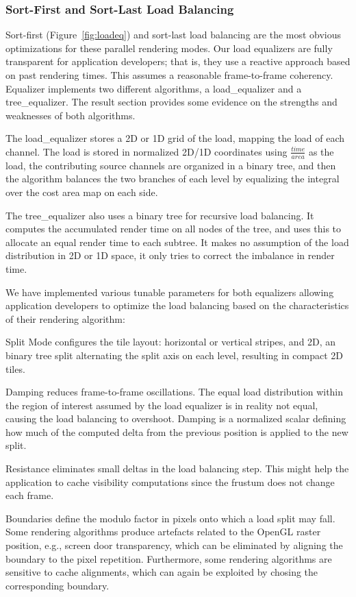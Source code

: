 \documentclass[10pt,journal,compsoc]{IEEEtran}
\newcommand{\fig}[1]{Figure~\ref{#1}}
\begin{document}
\subsubsection{Sort-First and Sort-Last Load Balancing}

Sort-first (\fig{fig:loadeq}) and sort-last load balancing are the most obvious
optimizations for these parallel rendering modes. Our load equalizers are fully
transparent for application developers; that is, they use a reactive approach
based on past rendering times. This assumes a reasonable frame-to-frame
coherency. Equalizer implements two different algorithms, a
\textsf{load\_equalizer} and a \textsf{tree\_equalizer}. The result section
provides some evidence on the strengths and weaknesses of both algorithms.

The \textsf{load\_equalizer} stores a 2D or 1D grid of the load, mapping the
load of each channel. The load is stored in normalized 2D/1D coordinates using
$\frac{time}{area}$ as the load, the contributing source channels are organized
in a binary tree, and then the algorithm balances the two branches of each level
by equalizing the integral over the cost area map on each side.

The \textsf{tree\_equalizer} also uses a binary tree for recursive load
balancing. It computes the accumulated render time on all nodes of the tree, and
uses this to allocate an equal render time to each subtree. It makes no
assumption of the load distribution in 2D or 1D space, it only tries to correct
the imbalance in render time.

We have implemented various tunable parameters for both equalizers allowing
application developers to optimize the load balancing based on the
characteristics of their rendering algorithm:

\begin{compactdesc}
\item[Split Mode] configures the tile layout: horizontal or vertical stripes,
and 2D, an binary tree split alternating the split axis on each level, resulting
in compact 2D tiles.
\item[Damping] reduces frame-to-frame oscillations. The equal load distribution
within the region of interest assumed by the load equalizer is in reality not
equal, causing the load balancing to overshoot. Damping is a normalized scalar
defining how much of the computed delta from the previous position is applied to
the new split.
\item[Resistance] eliminates small deltas in the load balancing step. This might
help the application to cache visibility computations since the frustum does not
change each frame.
\item[Boundaries] define the modulo factor in pixels onto which a load split may
fall. Some rendering algorithms produce artefacts related to the OpenGL raster
position, e.g., screen door transparency, which can be eliminated by aligning
the boundary to the pixel repetition. Furthermore, some rendering algorithms are
sensitive to cache alignments, which can again be exploited by chosing the
corresponding boundary.
\end{compactdesc}
\end{document}
